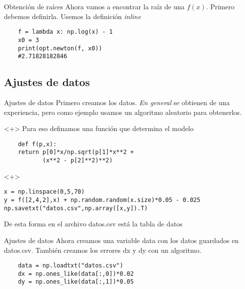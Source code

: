 \documentclass{beamer}
\begin{document}
\begin{frame}[fragile]{Obtención de raíces}
    Ahora vamos a encontrar la raíz de una $f(x)$.
    Primero debemos definirla. Usemos la definición \emph{inline}
    
    \begin{verbatim}
    f = lambda x: np.log(x) - 1
    x0 = 3
    print(opt.newton(f, x0))
    #2.71828182846
    \end{verbatim}
    
\end{frame}

\subsection{Ajustes de datos}


\begin{frame}[fragile]{Ajustes de datos}
    Primero creamos los datos. \emph{En general} se obtienen de una experiencia, pero como ejemplo usamos un algoritmo aleatorio para obtenerlos.
    
    \begin{onlyenv}<+>
    Para eso definamos una función que determina el modelo
    
    \begin{verbatim}
    def f(p,x):  
    return p[0]*x/np.sqrt(p[1]*x**2 + 
           (x**2 - p[2]**2)**2)
    \end{verbatim}
    
    \end{onlyenv}
    
    \begin{onlyenv}<+>
    
    \begin{verbatim}
x = np.linspace(0,5,70)
y = f([2,4,2],x) + np.random.random(x.size)*0.05 - 0.025
np.savetxt("datos.csv",np.array([x,y]).T)
\end{verbatim}
    
   De esta forma en el archivo datos.csv está la tabla de datos
   \end{onlyenv}
\end{frame}

\begin{frame}[fragile]{Ajustes de datos}
    Ahora creamos una variable data con los datos guardados en datos.csv. También creamos los errores dx y dy con un algoritmo.
    \begin{verbatim}
    data = np.loadtxt("datos.csv")
    dx = np.ones_like(data[:,0])*0.02
    dy = np.ones_like(data[:,1])*0.05
   \end{verbatim}
   
\end{frame}
\end{document}
